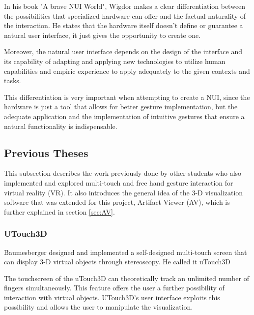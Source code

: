 \documentclass[12pt]{extarticle}
\begin{document}
In his book "A brave NUI World"\cite{NUIWorld}, Wigdor makes a clear differentiation between the possibilities that specialized hardware can offer and the factual naturality of the interaction. He states that the hardware itself doesn't define or guarantee a natural user interface, it just gives the opportunity to create one. 

Moreover, the natural user interface depends on the design of the interface and its capability of adapting and applying new technologies to utilize human capabilities and empiric experience to apply adequately to the given contexts and tasks.


This differentiation is very important when attempting to create a NUI, since the hardware is just a tool that allows for better gesture implementation, but the adequate application and the implementation of intuitive gestures that ensure a natural functionality is indispensable.

\subsection {Previous Theses}
This subsection describes the work previously done by other students who also implemented and explored multi-touch and free hand gesture interaction for virtual reality (VR). It also introduces the general idea of the 3-D visualization software that was extended for this project, Artifact Viewer (AV), which is further explained in section \ref{sec:AV}.

\subsubsection {UTouch3D\cite{Bau10,Deli13}}
Baumesberger designed and implemented a self-designed multi-touch screen that can display 3-D virtual objects through stereoscopy. He called it uTouch3D

The touchscreen of the uTouch3D can theoretically track an unlimited number of fingers simultaneously. This feature offers the user a further possibility of interaction with virtual objects. UTouch3D's user interface exploits this possibility and allows the user to manipulate the visualization.
\end{document}
